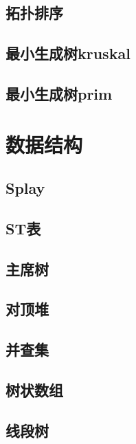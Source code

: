 \documentclass{article}
\begin{document}
\begin{multicols*}{2}
\subsection{拓扑排序}

\subsection{最小生成树kruskal}

\subsection{最小生成树prim}

\section{数据结构}
\subsection{Splay}

\subsection{ST表}

\subsection{主席树}

\subsection{对顶堆}

\subsection{并查集}

\subsection{树状数组}

\subsection{线段树}


\end{multicols*}
\end{document}
